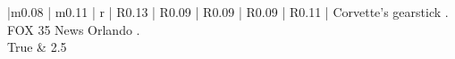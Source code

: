 \begin{table}[H]
\begin{tabular}{|m{} | m{} | r | R{0.13\textwidth} | R{0.09\textwidth} | R{0.09\textwidth} | R{0.09\textwidth} | R{0.11\textwidth} |}
Corvette's gearstick . FOX 35 News Orlando .  \\
True & 2.5%

\end{tabular}
\end{table}
